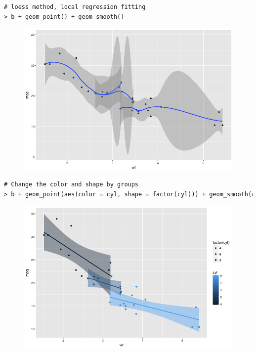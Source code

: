 \begin{lstlisting}[language=html]
# loess method, local regression fitting
> b + geom_point() + geom_smooth()
\end{lstlisting}
\begin{figure}[H]\begin{center}\includegraphics[scale=1 ]{ilu/bg47.png}\end{center}\end{figure}
\begin{lstlisting}[language=html]
# Change the color and shape by groups 
> b + geom_point(aes(color = cyl, shape = factor(cyl))) + geom_smooth(aes(color = cyl, fill = cyl), method = lm)
\end{lstlisting}
\begin{figure}[H]\begin{center}\includegraphics[scale=1 ]{ilu/bg48.png}\end{center}\end{figure}
